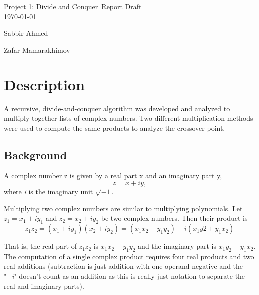 \documentclass[usletter, 12pt]{article}
\newcommand{\project}{Project 1: Divide and Conquer}
\newcommand{\Sabbir}{Sabbir Ahmed}
\newcommand{\Zafar}{Zafar Mamarakhimov}
\begin{document}

    \begin{titlepage}

        \vspace*{\fill} %
        \begin{center}

            {\LARGE \project~Report Draft}\\ [1.5cm]

            \today
            
            \vspace*{\fill}

            \Sabbir

            \Zafar

        \end{center}
        \vspace*{\fill} %

    \end{titlepage}

    \section{Description}

        A recursive, divide-and-conquer algorithm was developed and analyzed to multiply together lists of complex numbers. Two different multiplication methods were used to compute the same products to analyze the crossover point.

        \subsection{Background}

        A complex number z is given by a real part x and an imaginary part y,
            \[ z=x+iy, \]
        where \textit{i} is the imaginary unit $\sqrt{-1}$.

        Multiplying two complex numbers are similar to multiplying polynomials. Let $z_{1}=x_{1}+iy_{1}$ and $z_{2}=x_{2}+iy_{2}$ be two complex numbers. Then their product is
            \[ z_{1}z_{2}=(x_{1}+iy_{1})(x_{2}+iy_{2})=(x_{1}x_{2}-y_{1}y_{2})+i(x_{1}y2+y_{1}x_{2}) \]

        That is, the real part of $z_{1}z_{2}$ is $x_{1}x_{2}-y_{1}y_{2}$ and the imaginary part is $x_{1}y_{2}+y_{1}x_{2}$. The computation of a single complex product requires four real products and two real additions (subtraction is just addition with one operand negative and the "+\textit{i}" doesn't count as an addition as this is really just notation to separate the real and imaginary parts).
\end{document}
